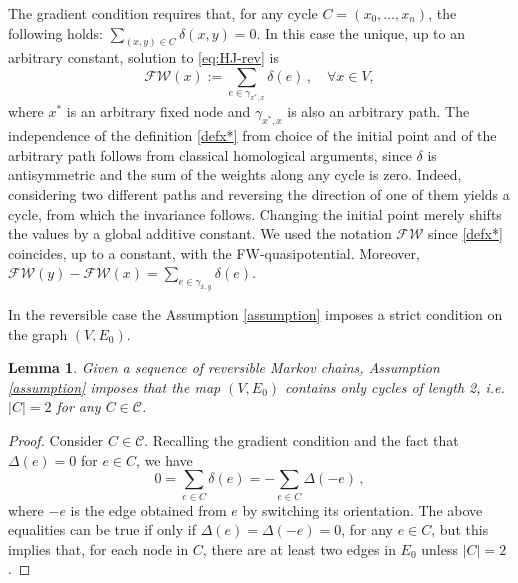 \documentclass[reqno]{amsart}
\theoremstyle{plain}
\newtheorem{lemma}[theorem]{Lemma}
\theoremstyle{definition}
\theoremstyle{remark}
\numberwithin{equation}{section}
\numberwithin{theorem}{section}
\newcommand{\<}{\langle}
\renewcommand{\>}{\rangle}
\begin{document}
The gradient condition requires that, for any cycle $C=(x_0,\dots, x_n)$, the following  holds: $\sum_{(x,y)\in C}\delta(x,y)=0$. In this case the unique, up to an arbitrary constant, solution to \eqref{eq:HJ-rev} is 
\begin{equation}\label{defx*}
	\mathscr{FW}(x):=\sum_{e\in \gamma_{x^*,x}}\delta(e)\,,\quad \forall x\in V,
\end{equation}
where $x^*$ is an arbitrary fixed node and $\gamma_{x^*,x}$ is also an arbitrary path. The independence of the definition \eqref{defx*} from choice of the initial point and of the arbitrary path follows from classical homological arguments, since $\delta$ is antisymmetric and the sum of the weights along any cycle is zero. Indeed, considering two different paths and reversing the direction of one of them yields a cycle, from which the invariance follows. Changing the initial point merely shifts the values by a global additive constant. We used the notation $\mathscr{FW}$ since \eqref{defx*} coincides, up to a constant, with the FW-quasipotential.
Moreover, $\mathscr{FW}(y)-\mathscr{FW}(x)=\sum_{e\in \gamma_{x,y}}\delta(e)$.


In the reversible case the Assumption \ref{assumption} imposes a strict condition on the graph $(V,E_0)$. 

\begin{lemma}
	Given a sequence of reversible Markov chains, Assumption \ref{assumption} imposes that the map  $(V,E_0)$ contains only cycles of length 2, i.e. $|C|=2$ for any $C\in \mathcal C$.
\end{lemma} 
\begin{proof}
	Consider $C\in \mathcal C$. Recalling the gradient condition and the fact that $\Delta(e)=0$ for $e\in C$, we have
	\[
	0=\sum_{e\in C}\delta(e)=-\sum_{e\in C}\Delta(-e)\,,
	\]
	where $-e$ is the edge obtained from $e$ by switching its orientation. The above equalities can be true if only if $\Delta(e)=\Delta(-e)=0$, for any $e\in C$, but this implies that, for each node in $C$, there are at least two edges in $E_0$ unless $|C|=2$.
\end{proof}
\end{document}
